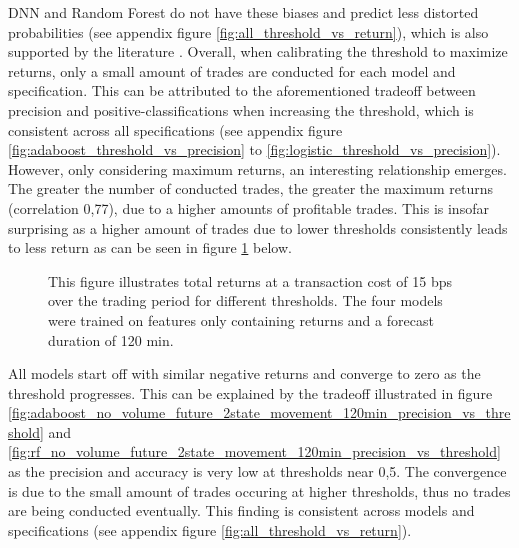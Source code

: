 DNN and Random Forest do not have these biases
and predict less distorted probabilities (see appendix figure \ref{fig:all_threshold_vs_return}), which is also supported by the literature \cite{caruana2005probabilityDistortion}. 
Overall, when calibrating the threshold to maximize returns, only a small amount of trades are conducted for each model and specification.
This can be attributed to the aforementioned tradeoff between precision and positive-classifications when increasing the threshold, 
which is consistent across all specifications
(see appendix figure \ref{fig:adaboost_threshold_vs_precision} to \ref{fig:logistic_threshold_vs_precision}). 
However, only considering maximum returns, an interesting relationship emerges. 
The greater the number of conducted trades, the greater the maximum returns (correlation 0,77), due to a higher amounts of profitable trades.
This is insofar surprising as a higher amount of trades due to lower thresholds consistently leads to less return as can be seen in figure 
\ref{fig:all_threshold_vs_return_15bps_no_volume_120min} below.

\begin{figure}[H]
    \captionsetup{format=plain}
    \caption{ 
            This figure illustrates total returns at a transaction cost of 15 bps over the trading period for different thresholds.
            The four models were trained on features only containing returns and a forecast duration of 120 min.
        }
    \label{fig:all_threshold_vs_return_15bps_no_volume_120min}
\end{figure}

All models start off with similar negative returns and converge to zero as the threshold progresses. 
This can be explained by the tradeoff illustrated in figure 
\ref{fig:adaboost_no_volume_future_2state_movement_120min_precision_vs_threshold} and \ref{fig:rf_no_volume_future_2state_movement_120min_precision_vs_threshold}
as the precision and accuracy is very low at thresholds near 0,5. 
The convergence is due to the small amount of trades occuring at higher thresholds, thus no trades are being conducted eventually.
This finding is consistent across models and specifications (see appendix figure \ref{fig:all_threshold_vs_return}).




